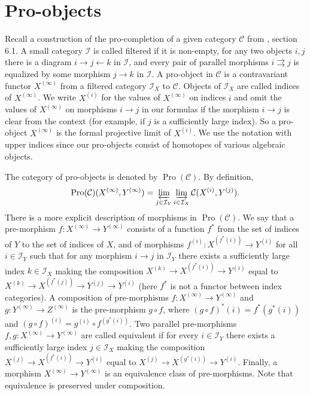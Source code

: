 \documentclass{article}
\newcommand{\rar}{\rightarrow}
\newcommand{\lar}{\leftarrow}
\DeclareMathOperator{\Pro}{Pro}
\begin{document}
\section{Pro-objects}Recall a construction of the pro-completion of a given category \(\mathcal C\) from \cite{CategoryTextbook}, section 6.1. A small category \(\mathcal I\) is called filtered if it is non-empty, for any two objects \(i, j\) there is a diagram \(i \rar j \lar k\) in \(\mathcal I\), and every pair of parallel morphisms \(i \rightrightarrows j\) is equalized by some morphism \(j \rar k\) in \(\mathcal I\). A pro-object in \(\mathcal C\) is a contravariant functor \(X^{(\infty)}\) from a filtered category \(\mathcal I_X\) to \(\mathcal C\). Objects of \(\mathcal I_X\) are called indices of \(X^{(\infty)}\). We write \(X^{(i)}\) for the values of \(X^{(\infty)}\) on indices \(i\) and omit the values of \(X^{(\infty)}\) on morphisms \(i \rar j\) in our formulas if the morphism \(i \rar j\) is clear from the context (for example, if \(j\) is a sufficiently large index). So a pro-object \(X^{(\infty)}\) is the formal projective limit of \(X^{(i)}\). We use the notation with upper indices since our pro-objects consist of homotopes of various algebraic objects.

The category of pro-objects is denoted by \(\Pro(\mathcal C)\). By definition,
\[
\Pro(\mathcal C)(X^{(\infty)}, Y^{(\infty)}) = \varprojlim_{j \in \mathcal I_Y} \varinjlim_{i \in \mathcal I_X} \mathcal C(X^{(i)}, Y^{(j)}).
\]
There is a more explicit description of morphisms in \(\Pro(\mathcal C)\). We say that a pre-morphism \(f \colon X^{(\infty)} \rar Y^{(\infty)}\) consists of a function \(f^*\) from the set of indices of \(Y\) to the set of indices of \(X\), and of morphisms \(f^{(i)} \colon X^{(f^*(i))} \rar Y^{(i)}\) for all \(i \in \mathcal I_Y\) such that for any morphism \(i \rar j\) in \(\mathcal I_Y\) there exists a sufficiently large index \(k \in \mathcal I_X\) making the composition \(X^{(k)} \rar X^{(f^*(i))} \rar Y^{(i)}\) equal to \(X^{(k)} \rar X^{(f^*(j))} \rar Y^{(j)} \rar Y^{(i)}\) (here \(f^*\) is not a functor between index categories). A composition of pre-morphisms \(f \colon X^{(\infty)} \rar Y^{(\infty)}\) and \(g \colon Y^{(\infty)} \rar Z^{(\infty)}\) is the pre-morphism \(g \circ f\), where \((g \circ f)^*(i) = f^*(g^*(i))\) and \((g \circ f)^{(i)} = g^{(i)} \circ f^{(g^*(i))}\). Two parallel pre-morphisms \(f, g \colon X^{(\infty)} \rar Y^{(\infty)}\) are called equivalent if for every \(i \in \mathcal I_Y\) there exists a sufficiently large index \(j \in \mathcal I_X\) making the composition \(X^{(j)} \rar X^{(f^*(i))} \rar Y^{(i)}\) equal to \(X^{(j)} \rar X^{(g^*(i))} \rar Y^{(i)}\). Finally, a morphism \(X^{(\infty)} \rar Y^{(\infty)}\) is an equivalence class of pre-morphisms. Note that equivalence is preserved under composition.
\end{document}
